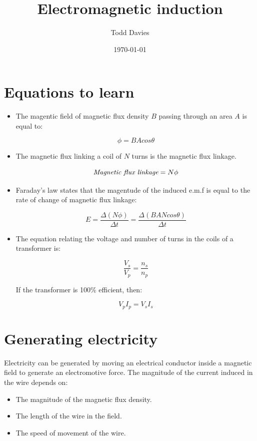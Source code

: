 \documentclass{article}
\title{Electromagnetic induction}
\author{Todd Davies}
\date{\today}
\begin{document}
\lhead{\today}

\maketitle

\section*{Equations to learn}
\thispagestyle{empty}

\begin{itemize}

	\item The magentic field of magnetic flux density $B$ passing through an
	area $A$ is equal to:

	\[
		\phi = BAcos\theta
	\]

	\item The magnetic flux linking a coil of $N$ turns is the magnetic flux
	linkage.

	\[
		\textrm{\it Magnetic flux linkage} = N\phi
	\]
	
	\item Faraday's law states that the magentude of the induced e.m.f is equal
	to the rate of change of magnetic flux linkage:

	\[
		E = \frac{\Delta(N\phi)}{\Delta t} = 
			\frac{\Delta(BANcos\theta)}{\Delta t}
	\]

	\item The equation relating the voltage and number of turns in the coils of
	a transformer is:

	\[
		\frac{V_s}{V_p} = \frac{n_s}{n_p}
	\]

	If the transformer is 100\% efficient, then:

	\[
		V_pI_p = V_sI_s
	\]

\end{itemize}

\section*{Generating electricity}

Electricity can be generated by moving an electrical conductor inside a magnetic
field to generate an electromotive force. The magnitude of the current induced
in the wire depends on:

\begin{itemize}

	\item The magnitude of the magnetic flux density.

	\item The length of the wire in the field.

	\item The speed of movement of the wire.

\end{itemize}
\end{document}
